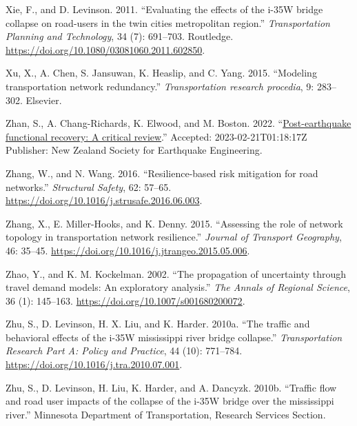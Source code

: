\documentclass[]{ascelike-new}
\newlength{\cslhangindent}
\newenvironment{CSLReferences}[2] %
 {\begin{list}{}{%
  \setlength{\itemindent}{0pt}
  \setlength{\leftmargin}{0pt}
  \setlength{\parsep}{0pt}
  \ifodd #1
   \setlength{\leftmargin}{\cslhangindent}
   \setlength{\itemindent}{-1\cslhangindent}
  \fi
  \setlength{\itemsep}{#2\baselineskip}}}
 {\end{list}}
\begin{document}
\begin{CSLReferences}{1}{0}
Xie, F., and D. Levinson. 2011. {``Evaluating the effects of the i-35W
bridge collapse on road-users in the twin cities metropolitan region.''}
\emph{Transportation Planning and Technology}, 34 (7): 691--703.
Routledge. \url{https://doi.org/10.1080/03081060.2011.602850}.

Xu, X., A. Chen, S. Jansuwan, K. Heaslip, and C. Yang. 2015. {``Modeling
transportation network redundancy.''} \emph{Transportation research
procedia}, 9: 283--302. Elsevier.

Zhan, S., A. Chang-Richards, K. Elwood, and M. Boston. 2022.
{``\href{https://repo.nzsee.org.nz/xmlui/handle/nzsee/2507}{Post-earthquake
functional recovery: A critical review}.''} Accepted:
2023-02-21T01:18:17Z Publisher: New Zealand Society for Earthquake
Engineering.

Zhang, W., and N. Wang. 2016. {``Resilience-based risk mitigation for
road networks.''} \emph{Structural Safety}, 62: 57--65.
\url{https://doi.org/10.1016/j.strusafe.2016.06.003}.

Zhang, X., E. Miller-Hooks, and K. Denny. 2015. {``Assessing the role of
network topology in transportation network resilience.''} \emph{Journal
of Transport Geography}, 46: 35--45.
\url{https://doi.org/10.1016/j.jtrangeo.2015.05.006}.

Zhao, Y., and K. M. Kockelman. 2002. {``The propagation of uncertainty
through travel demand models: An exploratory analysis.''} \emph{The
Annals of Regional Science}, 36 (1): 145--163.
\url{https://doi.org/10.1007/s001680200072}.

Zhu, S., D. Levinson, H. X. Liu, and K. Harder. 2010a. {``The traffic
and behavioral effects of the i-35W mississippi river bridge
collapse.''} \emph{Transportation Research Part A: Policy and Practice},
44 (10): 771--784. \url{https://doi.org/10.1016/j.tra.2010.07.001}.

Zhu, S., D. Levinson, H. Liu, K. Harder, and A. Dancyzk. 2010b.
{``Traffic flow and road user impacts of the collapse of the i-35W
bridge over the mississippi river.''} Minnesota Department of
Transportation, Research Services Section.

\end{CSLReferences}
\end{document}
